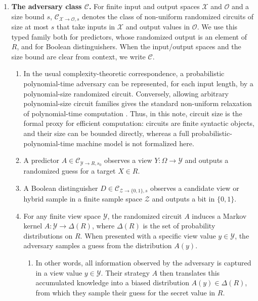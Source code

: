 \documentclass[11pt]{article}
\newcommand{\C}{\mathcal{C}}
\newcommand{\Yspace}{\mathcal{Y}}
\begin{document}
\begin{enumerate}
\item \textbf{The adversary class $\C$.} For finite input and output spaces $\mathcal{X}$ and $\mathcal{O}$ and a size bound $s$, $\C_{\mathcal{X} \to \mathcal{O}, s}$ denotes the class of non-uniform randomized circuits of size at most $s$ that take inputs in $\mathcal{X}$ and output values in $\mathcal{O}$. We use this typed family both for predictors, whose randomized output is an element of $R$, and for Boolean distinguishers. When the input/output spaces and the size bound are clear from context, we write $\C$.
  \begin{enumerate}[label=6.\arabic*.]
  \item In the usual complexity-theoretic correspondence, a probabilistic polynomial-time adversary can be represented, for each input length, by a polynomial-size randomized circuit. Conversely, allowing arbitrary polynomial-size circuit families gives the standard non-uniform relaxation of polynomial-time computation \cite[Lecture~4, Thm.~16]{trevisan-randomized-circuits}\cite[Lecture~8]{goldreich-cc-notes}\cite[Chap.~6]{arora-barak-circuits}. Thus, in this note, circuit size is the formal proxy for efficient computation: circuits are finite syntactic objects, and their size can be bounded directly, whereas a full probabilistic-polynomial-time machine model is not formalized here.
  \item A predictor $A \in \C_{\Yspace \to R, s_0}$ observes a view $Y : \Omega \to \Yspace$ and outputs a randomized guess for a target $X \in R$.
  \item A Boolean distinguisher $D \in \C_{\mathcal{Z} \to \{0,1\}, s}$ observes a candidate view or hybrid sample in a finite sample space $\mathcal{Z}$ and outputs a bit in $\{0,1\}$.
  \item For any finite view space $\Yspace$, the randomized circuit $A$ induces a Markov kernel $A : \Yspace \to \Delta(R)$, where $\Delta(R)$ is the set of probability distributions on $R$. When presented with a specific view value $y \in \Yspace$, the adversary samples a guess from the distribution $A(y)$.
    \begin{enumerate}[label=6.3.\arabic*.]
    \item In other words, all information observed by the adversary is captured in a view value $y \in \Yspace$. Their strategy $A$ then translates this accumulated knowledge into a biased distribution $A(y) \in \Delta(R)$, from which they sample their guess for the secret value in $R$.
    \end{enumerate}

\end{enumerate}
\end{enumerate}
\end{document}
